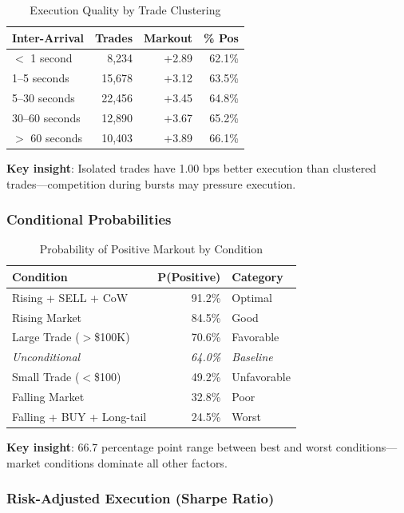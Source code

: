 \documentclass[12pt,a4paper]{article}
\begin{document}
\begin{table}[H]
\centering
\caption{Execution Quality by Trade Clustering}
\begin{tabular}{lrrr}
\toprule
\textbf{Inter-Arrival} & \textbf{Trades} & \textbf{Markout} & \textbf{\% Pos} \\
\midrule
$<$ 1 second & 8,234 & +2.89 & 62.1\% \\
1--5 seconds & 15,678 & +3.12 & 63.5\% \\
5--30 seconds & 22,456 & +3.45 & 64.8\% \\
30--60 seconds & 12,890 & +3.67 & 65.2\% \\
$>$ 60 seconds & 10,403 & +3.89 & 66.1\% \\
\bottomrule
\end{tabular}
\end{table}

\textbf{Key insight}: Isolated trades have 1.00 bps better execution than clustered trades---competition during bursts may pressure execution.

\subsubsection{Conditional Probabilities}

\begin{table}[H]
\centering
\caption{Probability of Positive Markout by Condition}
\begin{tabular}{lrl}
\toprule
\textbf{Condition} & \textbf{P(Positive)} & \textbf{Category} \\
\midrule
Rising + SELL + CoW & 91.2\% & Optimal \\
Rising Market & 84.5\% & Good \\
Large Trade ($>$\$100K) & 70.6\% & Favorable \\
\textit{Unconditional} & \textit{64.0\%} & \textit{Baseline} \\
Small Trade ($<$\$100) & 49.2\% & Unfavorable \\
Falling Market & 32.8\% & Poor \\
Falling + BUY + Long-tail & 24.5\% & Worst \\
\bottomrule
\end{tabular}
\end{table}

\textbf{Key insight}: 66.7 percentage point range between best and worst conditions---market conditions dominate all other factors.

\subsubsection{Risk-Adjusted Execution (Sharpe Ratio)}
\end{document}
